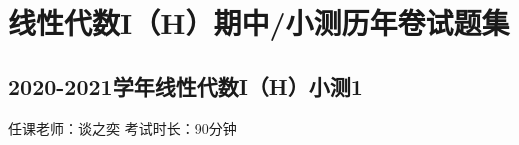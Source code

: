 \chapter*{线性代数I（H）期中/小测历年卷试题集}

\section*{2020-2021学年线性代数I（H）小测1}

\begin{center}
    任课老师：谈之奕\hspace{4em} 考试时长：90分钟
\end{center}

